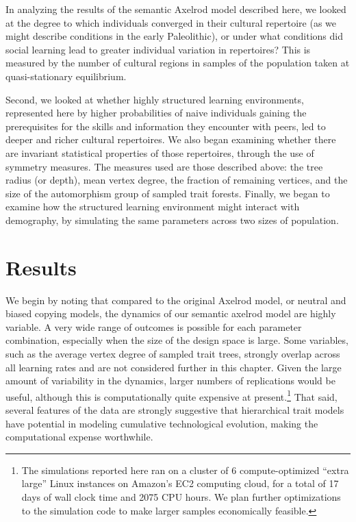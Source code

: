 \documentclass[graybox,natbib]{svmult}
\begin{document}
In analyzing the results of the semantic Axelrod model described here,
we looked at the degree to which individuals converged in their cultural
repertoire (as we might describe conditions in the early Paleolithic),
or under what conditions did social learning lead to greater individual
variation in repertoires? This is measured by the number of cultural
regions in samples of the population taken at quasi-stationary
equilibrium.

Second, we looked at whether highly structured learning environments,
represented here by higher probabilities of naive individuals gaining
the prerequisites for the skills and information they encounter with
peers, led to deeper and richer cultural repertoires. We also began
examining whether there are invariant statistical properties of those
repertoires, through the use of symmetry measures. The measures used are
those described above: the tree radius (or depth), mean vertex degree,
the fraction of remaining vertices, and the size of the automorphism
group of sampled trait forests. Finally, we began to examine how the
structured learning environment might interact with demography, by
simulating the same parameters across two sizes of population.

\section{Results}\label{results}

We begin by noting that compared to the original Axelrod model, or
neutral and biased copying models, the dynamics of our semantic axelrod
model are highly variable. A very wide range of outcomes is possible for
each parameter combination, especially when the size of the design space
is large. Some variables, such as the average vertex degree of sampled
trait trees, strongly overlap across all learning rates and are not
considered further in this chapter. Given the large amount of
variability in the dynamics, larger numbers of replications would be
useful, although this is computationally quite expensive at
present.\footnote{The simulations reported here ran on a cluster of 6
  compute-optimized ``extra large'' Linux instances on Amazon's EC2
  computing cloud, for a total of 17 days of wall clock time and 2075
  CPU hours. We plan further optimizations to the simulation code to
  make larger samples economically feasible.} That said, several
features of the data are strongly suggestive that hierarchical trait
models have potential in modeling cumulative technological evolution,
making the computational expense worthwhile.
\end{document}
